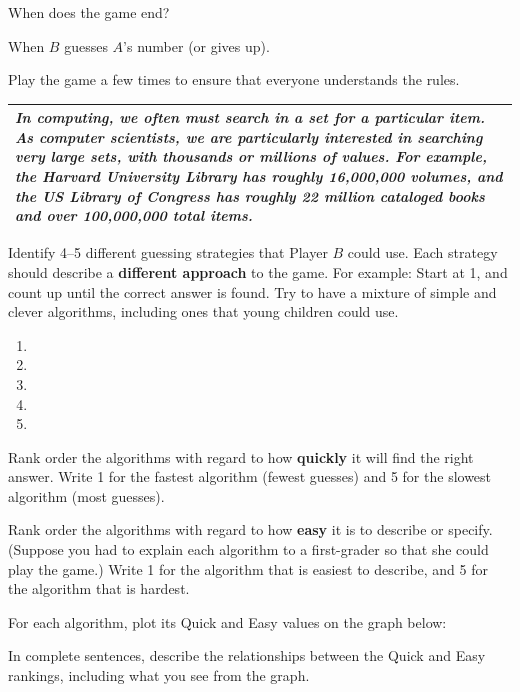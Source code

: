 \Q When does the game end?

\begin{answer}[2em]
When $B$ guesses $A$'s number (or gives up).
\end{answer}


\Q Play the game a few times to ensure that everyone understands the rules.

\begin{center}
\begin{tabularx}{\linewidth}{|X|}
\hline
\it
In computing, we often must search in a set for a particular item.
As computer scientists, we are particularly interested in searching very large sets, with thousands or millions of values.
For example, the Harvard University Library has roughly 16,000,000 volumes, and the US Library of Congress has roughly 22 million cataloged books and over 100,000,000 total items.
\\
\hline
\end{tabularx}
\end{center}


\Q Identify 4--5 different guessing strategies that Player $B$ could use.
Each strategy should describe a \textbf{different approach} to the game.
For example: Start at 1, and count up until the correct answer is found.
Try to have a mixture of simple and clever algorithms, including ones that young children could use.

\begin{enumerate}
\item 
\item 
\item 
\item 
\item 
\end{enumerate}


\Q Rank order the algorithms with regard to how \textbf{quickly} it will find the right answer.
Write 1 for the fastest algorithm (fewest guesses) and 5 for the slowest algorithm (most guesses).

\begin{answer}
\end{answer}


\Q Rank order the algorithms with regard to how \textbf{easy} it is to describe or specify.
(Suppose you had to explain each algorithm to a first-grader so that she could play the game.)
Write 1 for the algorithm that is easiest to describe, and 5 for the algorithm that is hardest.

\begin{answer}
\end{answer}


\Q For each algorithm, plot its Quick and Easy values on the graph below:

\begin{answer}
\end{answer}


\Q In complete sentences, describe the relationships between the Quick and Easy rankings, including what you see from the graph. 
